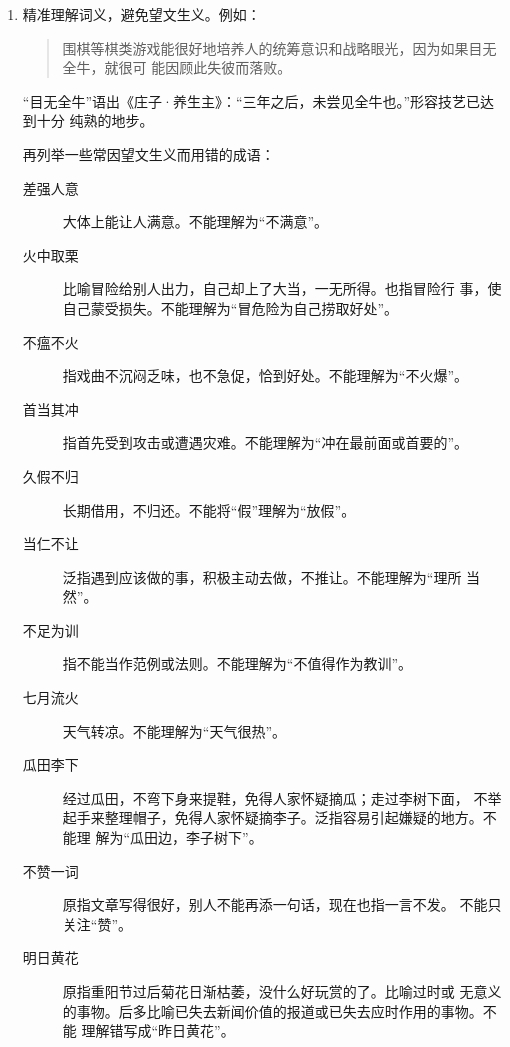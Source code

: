 \documentclass[final,oneside]{ctexbook}
\newenvironment{equotation}{\begin{quotation}\kaishu}{\end{quotation}}
\begin{document}
\begin{enumerate}
  \item 精准理解词义，避免望文生义。例如：
    \begin{equotation}
      围棋等棋类游戏能很好地培养人的统筹意识和战略眼光，因为如果目无全牛，就很可
      能因顾此失彼而落败。
    \end{equotation}
    “目无全牛”语出《庄子·养生主》：“三年之后，未尝见全牛也。”形容技艺已达到十分
    纯熟的地步。

    再列举一些常因望文生义而用错的成语：

    \begin{description}
      \item[差强人意] 大体上能让人满意。不能理解为“不满意”。

      \item[火中取栗] 比喻冒险给别人出力，自己却上了大当，一无所得。也指冒险行
        事，使自己蒙受损失。不能理解为“冒危险为自己捞取好处”。

      \item[不瘟不火] 指戏曲不沉闷乏味，也不急促，恰到好处。不能理解为“不火爆”。

      \item[首当其冲] 指首先受到攻击或遭遇灾难。不能理解为“冲在最前面或首要的”。

      \item[久假不归] 长期借用，不归还。不能将“假”理解为“放假”。

      \item[当仁不让] 泛指遇到应该做的事，积极主动去做，不推让。不能理解为“理所
        当然”。

      \item[不足为训] 指不能当作范例或法则。不能理解为“不值得作为教训”。

      \item[七月流火] 天气转凉。不能理解为“天气很热”。

      \item[瓜田李下] 经过瓜田，不弯下身来提鞋，免得人家怀疑摘瓜；走过李树下面，
        不举起手来整理帽子，免得人家怀疑摘李子。泛指容易引起嫌疑的地方。不能理
        解为“瓜田边，李子树下”。

      \item[不赞一词] 原指文章写得很好，别人不能再添一句话，现在也指一言不发。
        不能只关注“赞”。

      \item[明日黄花] 原指重阳节过后菊花日渐枯萎，没什么好玩赏的了。比喻过时或
        无意义的事物。后多比喻已失去新闻价值的报道或已失去应时作用的事物。不能
        理解错写成“昨日黄花”。


\end{description}
\end{enumerate}
\end{document}
